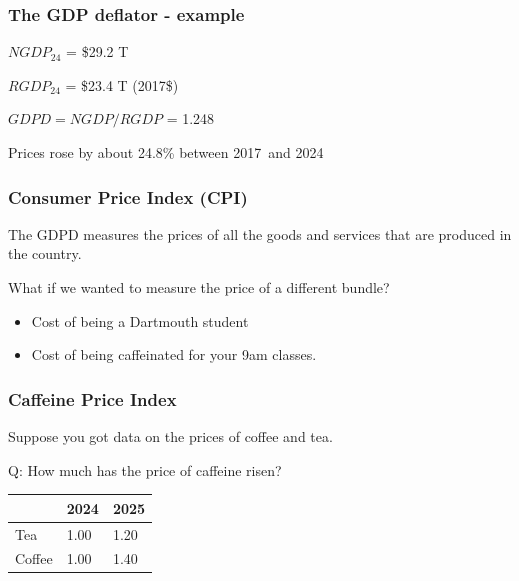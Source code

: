 \documentclass[aspectratio=169]{beamer}
\newenvironment{wideitemize}{\itemize\addtolength{\itemsep}{10pt}}{\enditemize}
\newcommand{\thisyear}{2025}
\newcommand{\lastyear}{2024}
\newcommand{\baseyear}{2017}
\newcommand{\lastyearshort}{24}
\begin{document}
\begin{frame}
\frametitle{The GDP deflator - example}

\begin{wideitemize}
\item $NGDP_{\lastyearshort}$ = \$29.2 T
\item $RGDP_{\lastyearshort}$ = \$23.4 T (\baseyear\$)
\item $GDPD = NGDP/RGDP$ = 1.248
\item Prices rose by about 24.8\% between \baseyear \  and \lastyear
\end{wideitemize}
\end{frame}


\begin{frame}
\frametitle{Consumer Price Index (CPI)}

\begin{wideitemize}
\item The GDPD measures the prices of all the goods and services that are produced in the country.

\item What if we wanted to measure the price of a different bundle?
\begin{itemize}
\item Cost of being a Dartmouth student
\item Cost of being caffeinated for your 9am classes.
\end{itemize}
\end{wideitemize}
\end{frame}

\begin{frame}
\frametitle{Caffeine Price Index}
\begin{wideitemize}
\item Suppose you got data on the prices of coffee and tea.
\end{wideitemize}
\begin{wideitemize}
\item Q:  How much has the price of caffeine risen?
\end{wideitemize}
\begin{center}
\begin{tabular}{|l|l|l|} \hline
 & \lastyear & \thisyear  \\ \hline
Tea & 1.00 & 1.20  \\ \hline
Coffee & 1.00 & 1.40  \\ \hline
\end{tabular}
\end{center}
\end{frame}
\end{document}
